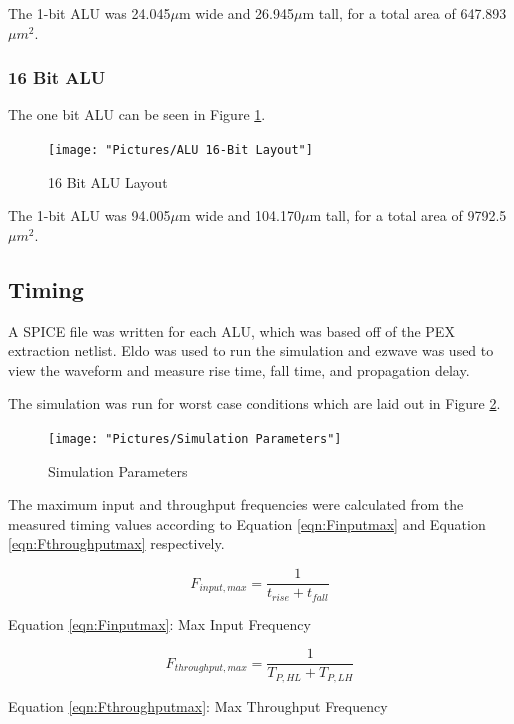 \documentclass[11pt]{article}
\begin{document}
			The 1-bit ALU was 24.045$\mu$m wide and 26.945$\mu$m tall, for a total area of 647.893$\mu m^2$.
	
		\subsubsection{16 Bit ALU}
		
			The one bit ALU can be seen in Figure \ref{fig:alu-16bit-layout}.
		
			\begin{figure}[H]
				\centering
				\texttt{[image: "Pictures/ALU 16-Bit Layout"]}
				\caption{16 Bit ALU Layout}
				\label{fig:alu-16bit-layout}
			\end{figure}
		
			The 1-bit ALU was 94.005$\mu$m wide and 104.170$\mu$m tall, for a total area of 9792.5$\mu m^2$.

	
	\subsection{Timing}
	
		A SPICE file was written for each ALU, which was based off of the PEX extraction netlist. Eldo was used to run the simulation and ezwave was used to view the waveform and measure rise time, fall time, and propagation delay.
		
		The simulation was run for worst case conditions which are laid out in Figure \ref{fig:simulation-parameters}. 
		
		\begin{figure}[H]
			\centering
			\texttt{[image: "Pictures/Simulation Parameters"]}
			\caption{Simulation Parameters}
			\label{fig:simulation-parameters}
		\end{figure}
		
		
		The maximum input and throughput frequencies were calculated from the measured timing values according to Equation \ref{eqn:Finputmax} and Equation \ref{eqn:Fthroughputmax} respectively. 
		
		\begin{equation}\label{eqn:Finputmax}
		F_{input,max} = \frac{1}{t_{rise}+t_{fall}}
		\end{equation}
		\begin{center}
			Equation \ref{eqn:Finputmax}: Max Input Frequency
		\end{center}
		
		\begin{equation}\label{eqn:Fthroughputmax}
		F_{throughput,max} = \frac{1}{T_{P,HL}+T_{P,LH}}
		\end{equation}
		\begin{center}
			Equation \ref{eqn:Fthroughputmax}: Max Throughput Frequency
		\end{center}
	
\end{document}
